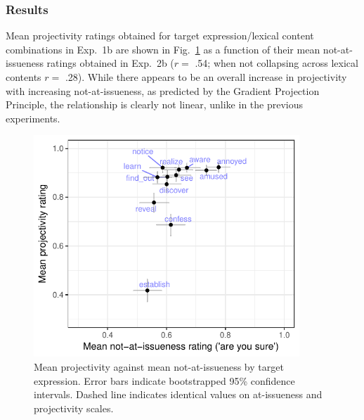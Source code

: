 \documentclass[11pt,fleqn]{article}
\newcommand{\6}{\mbox{$[\hspace*{-.6mm}[$}}
\newcommand{\9}{\mbox{$]\hspace*{-.6mm}]$}}
\newcommand{\figref}[1]{Fig.~\ref{#1}}
\begin{document}
\subsubsection{Results}

Mean projectivity ratings obtained for target expression/lexical content combinations in Exp.~1b are shown in \figref{fig:f-proj-ai-2b} as a function of their mean not-at-issueness ratings obtained in Exp.~2b ($r =$ .54; when not collapsing across lexical contents $r =$ .28). While there appears to be an overall increase in projectivity with increasing not-at-issueness, as predicted by the Gradient Projection Principle, the relationship is clearly not linear, unlike in the previous experiments.

\begin{figure}[!h]

\begin{center}
\includegraphics[width=10cm]{../results/exp2b/graphs/ai-proj-bytrigger-labels}
\end{center}

\caption{Mean projectivity against mean not-at-issueness by target expression. Error bars indicate bootstrapped 95\% confidence intervals. Dashed line indicates identical values on at-issueness and projectivity scales.}
\label{fig:f-proj-ai-2b}
\end{figure}


%
%
%
%
%
\end{document}

